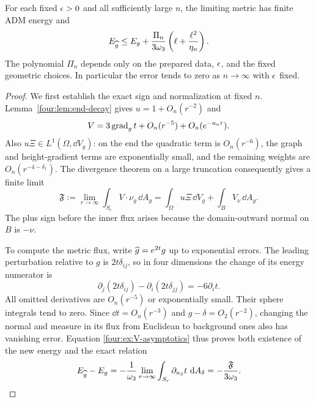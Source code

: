 \begin{proposition}\label{four:prop:mass-comparison}
For each fixed $\epsilon>0$ and all sufficiently large $n$, the limiting
metric has finite ADM energy and
\begin{equation}\label{four:ex:energy-error}
 E_{\widehat g}\le E_g+\frac{\Pi_n}{3\omega_3}
                  \left(\ell+\frac{\ell^2}{\eta_n}\right).
\end{equation}
The polynomial $\Pi_n$ depends only on the prepared data, $\epsilon$,
and the fixed geometric choices.  In particular the error tends to
zero as $n\to\infty$ with $\epsilon$ fixed.
\end{proposition}

\begin{proof}
We first establish the exact sign and normalization at fixed $n$.
Lemma~\ref{four:lem:end-decay} gives $u=1+O_n(r^{-2})$ and
\begin{equation}\label{four:ex:V-asymptotics}
 V=3\operatorname{grad}_gt+O_n(r^{-5})+O_n(e^{-a_nr}).
\end{equation}
Also $u\Xi\in L^1(\Omega,\dd V_g)$: on the end the quadratic term
is $O_n(r^{-6})$, the graph and height-gradient terms are exponentially
small, and the remaining weights are $O_n(r^{-4-\delta_1})$.
The divergence theorem on a large truncation consequently gives a
finite limit
\begin{equation}\label{four:ex:flux}
 \mathfrak F:=\lim_{r\to\infty}\int_{S_r}V\cdot\nu_g\,\dd A_g
   =\int_\Omega u\Xi\,\dd V_g+\int_B V_\nu\,\dd A_g.
\end{equation}
The plus sign before the inner flux arises because the domain-outward
normal on $B$ is $-\nu$.

To compute the metric flux, write $\widehat g=e^{2t}g$ up to exponential
errors.  The leading perturbation relative to $g$ is $2t\delta_{ij}$,
so in four dimensions the change of its energy numerator is
\[
 \partial_j(2t\delta_{ij})-\partial_i(2t\delta_{jj})
 =-6\partial_i t.
\]
All omitted derivatives are $O_n(r^{-5})$ or exponentially small.
Their sphere integrals tend to zero.  Since $\dd t=O_n(r^{-3})$ and
$g-\delta=O_2(r^{-2})$, changing the normal and measure in its flux
from Euclidean to background ones also has vanishing error.  Equation
\eqref{four:ex:V-asymptotics} thus proves both existence of the new energy
and the exact relation
\begin{equation}\label{four:ex:mass-flux}
 E_{\widehat g}-E_g
 =-\frac1{\omega_3}\lim_{r\to\infty}
       \int_{S_r}\partial_{n_\delta}t\,\,\mathrm d A_\delta
 =-\frac{\mathfrak F}{3\omega_3}.
\end{equation}


\end{proof}
